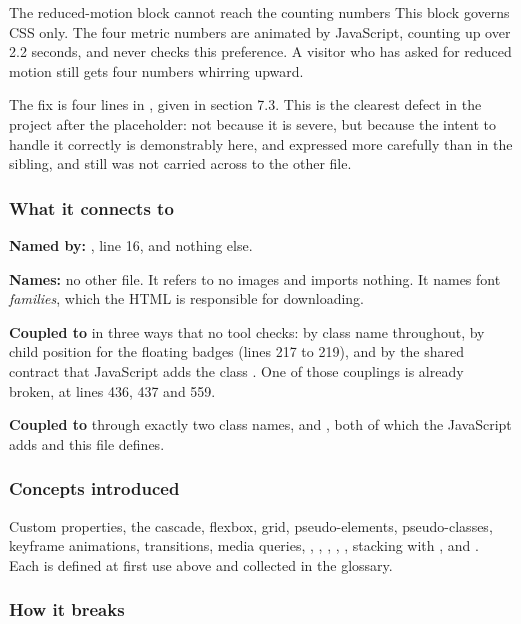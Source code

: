 \begin{honest}{The reduced-motion block cannot reach the counting numbers}
This block governs CSS only. The four metric numbers are animated by JavaScript,
counting up over 2.2 seconds, and  never checks this preference. A
visitor who has asked for reduced motion still gets four numbers whirring upward.

The fix is four lines in , given in section 7.3. This is the clearest
defect in the project after the placeholder: not because it is severe, but because
the intent to handle it correctly is demonstrably here, and expressed more carefully
than in the sibling, and still was not carried across to the other file.
\end{honest}

\subsubsection*{What it connects to}

\textbf{Named by:} , line 16, and nothing
else.

\textbf{Names:} no other file. It refers to no images and imports nothing. It names
font \emph{families}, which the HTML is responsible for downloading.

\textbf{Coupled to } in three ways that no tool checks: by class
name throughout, by child position for the floating badges (lines 217 to 219), and
by the shared contract that JavaScript adds the class . One of those
couplings is already broken, at lines 436, 437 and 559.

\textbf{Coupled to } through exactly two class names,
 and , both of which the JavaScript adds and this file
defines.

\subsubsection*{Concepts introduced}

Custom properties, the cascade, flexbox, grid, pseudo-elements, pseudo-classes,
keyframe animations, transitions, media queries, , ,
, , , stacking
with , and . Each is defined at first use
above and collected in the glossary.

\subsubsection*{How it breaks}

